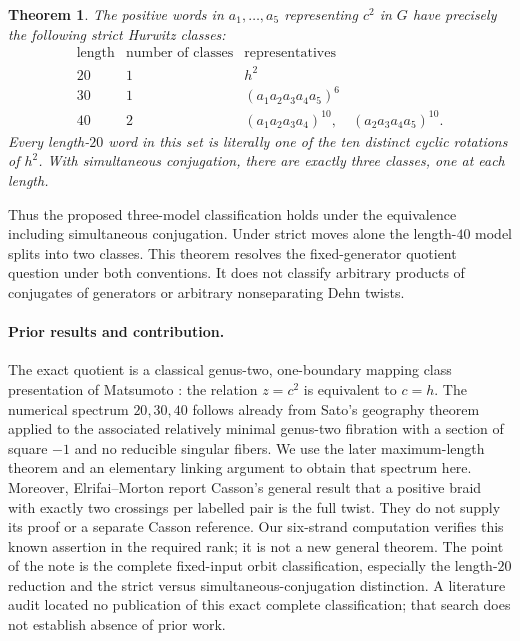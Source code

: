 \documentclass[11pt]{article}
\newtheorem{theorem}{Theorem}
\begin{document}
\begin{theorem}\label{main}
The positive words in \(a_1,\ldots,a_5\) representing \(c^2\) in \(G\)
have precisely the following strict Hurwitz classes:
\[
\begin{array}{ccl}
\text{length}&\text{number of classes}&\text{representatives}\\
\hline
20&1&h^2\\
30&1&(a_1a_2a_3a_4a_5)^6\\
40&2&(a_1a_2a_3a_4)^{10},\quad(a_2a_3a_4a_5)^{10}.
\end{array}
\]
Every length-\(20\) word in this set is literally one of the ten
distinct cyclic rotations of \(h^2\). With simultaneous conjugation,
there are exactly three classes, one at each length.
\end{theorem}

Thus the proposed three-model classification holds under the
equivalence including simultaneous conjugation. Under strict moves
alone the length-\(40\) model splits into two classes.
This theorem resolves the fixed-generator quotient question under
both conventions. It does not classify arbitrary products of
conjugates of generators or arbitrary nonseparating Dehn twists.

\paragraph{Prior results and contribution.}
The exact quotient is a classical genus-two, one-boundary mapping
class presentation of Matsumoto \cite[Theorem 1.3]{M}:
the relation \(z=c^2\) is equivalent to \(c=h\).
The numerical spectrum \(20,30,40\) follows already from
Sato's geography theorem \cite[Theorem 5.1, Table 1, Remark 5.1(1)]{S}
applied to the associated relatively minimal genus-two fibration
with a section of square \(-1\) and no reducible singular fibers.
We use the later maximum-length theorem \cite[Theorem A]{BMVHM}
and an elementary linking argument to obtain that spectrum here.
Moreover, Elrifai--Morton \cite[p.~496]{EM} report Casson's general
result that a positive braid with exactly two crossings per labelled
pair is the full twist. They do not supply its proof or a separate
Casson reference. Our six-strand computation verifies this known
assertion in the required rank; it is not a new general theorem.
The point of the note is the complete fixed-input orbit
classification, especially the length-\(20\) reduction and the
strict versus simultaneous-conjugation distinction.
A literature audit located no publication of this exact complete
classification; that search does not establish absence of prior work.
\end{document}
